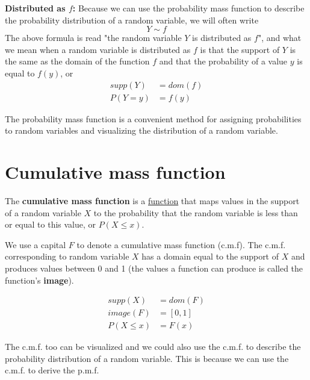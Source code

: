 \textbf{Distributed as $f$:} Because we can use the probability mass function to describe the probability distribution of a random variable, we will often write 
\begin{equation}
    Y \sim f
\end{equation}
The above formula is read "the random variable $Y$ is distributed as $f$", and what we mean when a random variable is distributed as $f$ is that the support of $Y$ is the same as the domain of the function $f$ and that the probability of a value $y$ is equal to $f(y)$, or 
\begin{align}
    supp(Y) &= dom(f)\\
    P(Y = y) &= f(y)
\end{align}

The probability mass function is a convenient method for assigning probabilities to random variables and visualizing the distribution of a random variable.

\section{Cumulative mass function}

The \textbf{cumulative mass function} is a \underline{function} that maps values in the support of a random variable $X$ to the probability that the random variable is less than or equal to this value, or $P(X \leq x)$.

We use a capital $F$ to denote a cumulative mass function (c.m.f).
The c.m.f. corresponding to random variable $X$ has a domain equal to the support of $X$ and produces values between 0 and 1 (the values a function can produce is called the function's \textbf{image}). 

\begin{align}
    supp(X) &= dom(F)\\
    image(F) &= [0,1]\\
    P(X \leq x) &= F(x)
\end{align}

The c.m.f. too can be visualized and we could also use the c.m.f. to describe the probability distribution of a random variable. 
This is because we can use the c.m.f. to derive the p.m.f.

